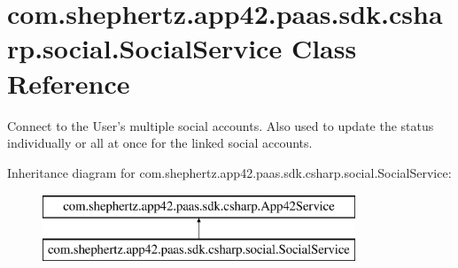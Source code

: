 \hypertarget{classcom_1_1shephertz_1_1app42_1_1paas_1_1sdk_1_1csharp_1_1social_1_1_social_service}{\section{com.\+shephertz.\+app42.\+paas.\+sdk.\+csharp.\+social.\+Social\+Service Class Reference}
\label{classcom_1_1shephertz_1_1app42_1_1paas_1_1sdk_1_1csharp_1_1social_1_1_social_service}
}


Connect to the User's multiple social accounts. Also used to update the status individually or all at once for the linked social accounts.  


Inheritance diagram for com.\+shephertz.\+app42.\+paas.\+sdk.\+csharp.\+social.\+Social\+Service\+:\begin{figure}[H]
\begin{center}
\leavevmode
\includegraphics[height=2.000000cm]{classcom_1_1shephertz_1_1app42_1_1paas_1_1sdk_1_1csharp_1_1social_1_1_social_service}
\end{center}
\end{figure}
